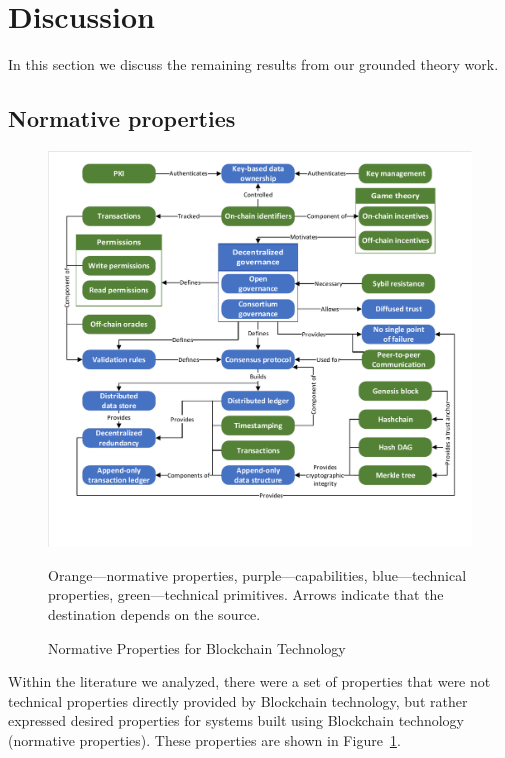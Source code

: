 
\section{Discussion}
In this section we discuss the remaining results from our grounded theory work.


\subsection{Normative properties}
\label{sec:normative}

\begin{figure}
	\centering
	\includegraphics[page=3,scale=.75]{figures/grounded-theory-main}
	
	{\small Orange---normative properties, purple---capabilities, blue---technical properties, green---technical primitives. Arrows indicate that the destination depends on the source.}
	\caption{Normative Properties for Blockchain Technology}
	\label{fig:normative-properties}
\end{figure}

Within the literature we analyzed, there were a set of properties that were not technical properties directly provided by Blockchain technology, but rather expressed desired properties for systems built using Blockchain technology (\ie normative properties).
These properties are shown in Figure~\ref{fig:normative-properties}.

